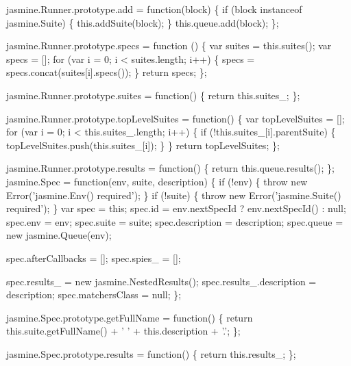 \begin{DoxyCodeInclude}
jasmine.Runner.prototype.add = \textcolor{keyword}{function}(block) \{
  \textcolor{keywordflow}{if} (block instanceof jasmine.Suite) \{
    this.addSuite(block);
  \}
  this.queue.add(block);
\};

jasmine.Runner.prototype.specs = \textcolor{keyword}{function} () \{
  var suites = this.suites();
  var specs = [];
  \textcolor{keywordflow}{for} (var i = 0; i < suites.length; i++) \{
    specs = specs.concat(suites[i].specs());
  \}
  \textcolor{keywordflow}{return} specs;
\};

jasmine.Runner.prototype.suites = \textcolor{keyword}{function}() \{
  \textcolor{keywordflow}{return} this.suites\_;
\};

jasmine.Runner.prototype.topLevelSuites = \textcolor{keyword}{function}() \{
  var topLevelSuites = [];
  \textcolor{keywordflow}{for} (var i = 0; i < this.suites\_.length; i++) \{
    \textcolor{keywordflow}{if} (!this.suites\_[i].parentSuite) \{
      topLevelSuites.push(this.suites\_[i]);
    \}
  \}
  \textcolor{keywordflow}{return} topLevelSuites;
\};

jasmine.Runner.prototype.results = \textcolor{keyword}{function}() \{
  \textcolor{keywordflow}{return} this.queue.results();
\};
jasmine.Spec = \textcolor{keyword}{function}(env, suite, description) \{
  \textcolor{keywordflow}{if} (!env) \{
    \textcolor{keywordflow}{throw} \textcolor{keyword}{new} Error(\textcolor{stringliteral}{'jasmine.Env() required'});
  \}
  \textcolor{keywordflow}{if} (!suite) \{
    \textcolor{keywordflow}{throw} \textcolor{keyword}{new} Error(\textcolor{stringliteral}{'jasmine.Suite() required'});
  \}
  var spec = \textcolor{keyword}{this};
  spec.id = env.nextSpecId ? env.nextSpecId() : null;
  spec.env = env;
  spec.suite = suite;
  spec.description = description;
  spec.queue = \textcolor{keyword}{new} jasmine.Queue(env);

  spec.afterCallbacks = [];
  spec.spies\_ = [];

  spec.results\_ = \textcolor{keyword}{new} jasmine.NestedResults();
  spec.results\_.description = description;
  spec.matchersClass = null;
\};

jasmine.Spec.prototype.getFullName = \textcolor{keyword}{function}() \{
  \textcolor{keywordflow}{return} this.suite.getFullName() + \textcolor{charliteral}{' '} + this.description + \textcolor{charliteral}{'.'};
\};


jasmine.Spec.prototype.results = \textcolor{keyword}{function}() \{
  \textcolor{keywordflow}{return} this.results\_;
\};


\end{DoxyCodeInclude}
